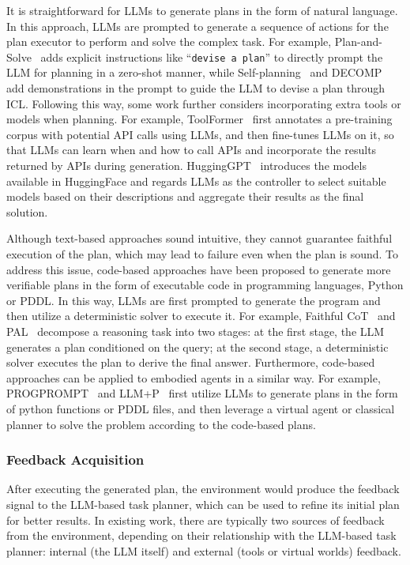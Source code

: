 It is straightforward for LLMs to generate plans in the form of natural language.
In this approach, LLMs are prompted to generate a sequence of actions for the plan executor to perform and solve the complex task.
For example, Plan-and-Solve~\cite{Wang-arXiv-2023-Plan} adds explicit instructions like ``\texttt{devise a plan}'' to directly prompt the LLM for planning in a zero-shot manner, while Self-planning~\cite{Jiang-arXiv-2023-Self} and DECOMP~\cite{Khot-2022-arXiv-Decomposed} add demonstrations in the prompt to guide the LLM to devise a plan through ICL.
Following this way, some work further considers incorporating extra tools or models when planning. 
For example, ToolFormer~\cite{Schick-arxiv-2023-Toolformer} first annotates a pre-training corpus with potential API calls using LLMs, and then fine-tunes LLMs on it,  so that LLMs can learn when and how to call APIs and incorporate the results returned by APIs during generation.
HuggingGPT~\cite{Shen-2023-arXiv-Hugginggpt} introduces the models available in HuggingFace and regards LLMs as the controller to select suitable models based on their descriptions and aggregate their results as the final solution.

Although text-based approaches sound intuitive, they cannot guarantee faithful execution of the plan, which may lead to failure even when the plan is sound. 
To address this issue, code-based approaches have been proposed to generate more verifiable plans in the form of executable code in  programming languages, \eg Python or PDDL.
In this way, LLMs are first prompted to generate the program and then utilize a deterministic solver to execute it.
For example, Faithful CoT~\cite{Lyu-arxiv-2023-Faithful} and PAL~\cite{Gao-arxiv-2022-PAL} decompose a reasoning task into two stages: at the first stage, the LLM generates a plan conditioned on the query; at the second stage, a deterministic solver executes the plan to derive the final answer. 
Furthermore, code-based approaches can be applied to embodied agents in a similar way. 
For example, PROGPROMPT~\cite{Singh-arxiv-2022-ProgPrompt} and LLM+P~\cite{Liu-2023-arXiv-LLM+P} first utilize LLMs to generate plans in the form of python functions or PDDL files, and then leverage a virtual agent or classical planner to solve the problem according to the code-based plans.

\subsubsection{Feedback Acquisition}
\label{sec:feedback}
After executing the generated plan, the environment would produce the feedback signal to the LLM-based task planner, which can be used to refine its initial plan for better results.
In existing work, there are typically two sources of feedback from the environment, depending on their relationship with the LLM-based task planner: internal (\ie the LLM itself) and external (\eg tools or virtual worlds) feedback.

